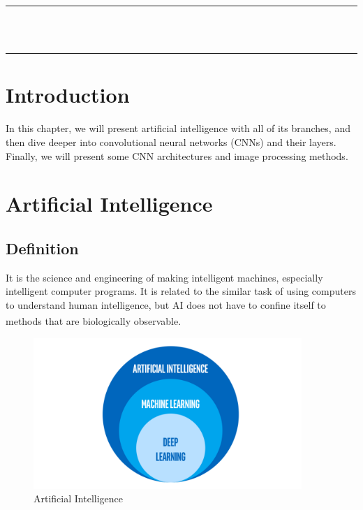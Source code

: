 \vspace*{\fill}
\begin{center}
    {\color{Black} \rule{\linewidth}{1.2mm} }\\
\vspace{0.25in}
    {\centering{}}
\vspace{0.35in}\\
    {\color{Black} \rule{\linewidth}{1.2mm} }
\end{center}
\vspace*{\fill}
\setcounter{section}{0}

\newpage

\section{Introduction}
\vspace{0.2in}
\hspace{\parindent}
In this chapter, we will present artificial intelligence with all of its branches, and then dive deeper into convolutional neural networks (CNNs) and their layers. Finally, we will present some CNN architectures and image processing methods.

\section{Artificial Intelligence}
\subsection{Definition}
\hspace{\parindent}
It is the science and engineering of making intelligent machines, especially intelligent computer programs. It is related to the similar task of using computers to understand human intelligence, but AI does not have to confine itself to methods that are biologically observable. \textsuperscript{\cite{mccarthy2004artificial}}

\vspace{0.2in}

\begin{figure}[h]
\centering
  \vspace{-0.1in}
    \centerline{\includegraphics[width = 4in]{../images/artificial-intelligence.png}}
    \caption{Artificial Intelligence}
\end{figure}

